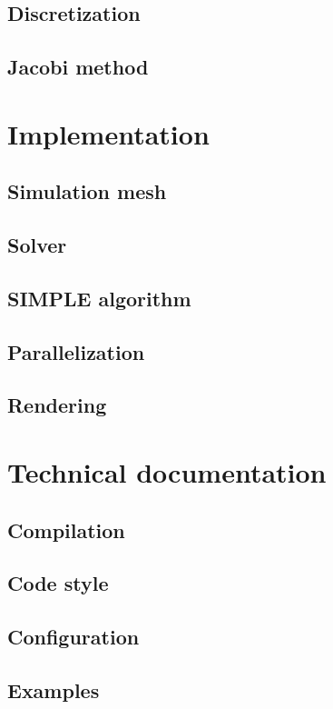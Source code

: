 \documentclass[12pt]{article}
\begin{document}
\subsection{Discretization}

\subsection{Jacobi method}

\section{Implementation}

\subsection{Simulation mesh}

\subsection{Solver}

\subsection{SIMPLE algorithm}

\subsection{Parallelization}

\subsection{Rendering}

\section{Technical documentation}

\subsection{Compilation}

\subsection{Code style}

\subsection{Configuration}

\subsection{Examples}

\begin{thebibliography}{9}


\end{thebibliography}
\end{document}
